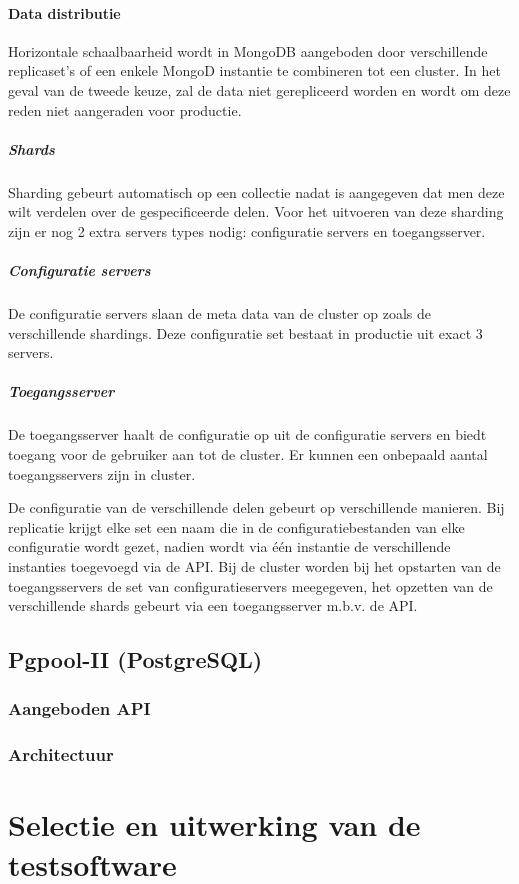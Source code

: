 \paragraph{Data distributie\cite{mongodb-shard}} Horizontale schaalbaarheid wordt in MongoDB aangeboden door verschillende replicaset's of een enkele MongoD instantie te combineren tot een cluster. In het geval van de tweede keuze, zal de data niet gerepliceerd worden en wordt om deze reden niet aangeraden voor productie. 
\subparagraph{Shards} Sharding gebeurt automatisch op een collectie nadat is aangegeven dat men deze wilt verdelen over de gespecificeerde delen. Voor het uitvoeren van deze sharding zijn er nog 2 extra servers types nodig: configuratie servers en toegangsserver. 
\subparagraph{Configuratie servers} De configuratie servers slaan de meta data van de cluster op zoals de verschillende shardings. Deze configuratie set bestaat in productie uit exact 3 servers.
\subparagraph{Toegangsserver} De toegangsserver haalt de configuratie op uit de configuratie servers en biedt toegang voor de gebruiker aan tot de cluster. Er kunnen een onbepaald aantal toegangsservers zijn in cluster. 

De configuratie van de verschillende delen gebeurt op verschillende manieren. Bij replicatie krijgt elke set een naam die in de configuratiebestanden van elke configuratie wordt gezet, nadien wordt via één instantie de verschillende instanties toegevoegd via de API. Bij de cluster worden bij het opstarten van de toegangsservers de set van configuratieservers meegegeven, het opzetten van de verschillende shards gebeurt via een toegangsserver m.b.v. de API. 

\subsection{Pgpool-II (PostgreSQL)}

\subsubsection{Aangeboden API} \todo{}

\subsubsection{Architectuur}

\section{Selectie en uitwerking van de testsoftware}



